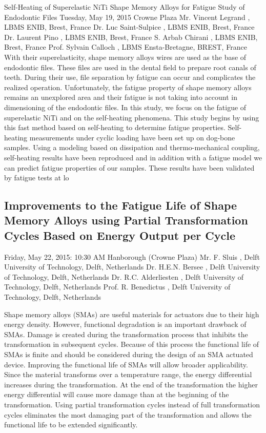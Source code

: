 \documentclass[12pt, a4paper]{article}
\begin{document}
Self-Heating of Superelastic NiTi Shape Memory Alloys for Fatigue Study of Endodontic Files
Tuesday, May 19, 2015
Crowne Plaza
Mr. Vincent Legrand , LBMS ENIB, Brest, France
Dr. Luc Saint-Sulpice , LBMS ENIB, Brest, France
Dr. Laurent Pino , LBMS ENIB, Brest, France
S. Arbab Chirani , LBMS ENIB, Brest, France
Prof. Sylvain Calloch , LBMS Ensta-Bretagne, BREST, France
With their superelasticity, shape memory alloys wires are used as the base of endodontic files. These files are used in the dental field to prepare root canals of teeth. During their use, file separation by fatigue can occur and complicates the realized operation. Unfortunately, the fatigue property of shape memory alloys remains an unexplored area and their fatigue is not taking into account in dimensioning of the endodontic files. In this study, we focus on the fatigue of superelastic NiTi and on the self-heating phenomena. This study begins by using this fast method based on self-heating to determine fatigue properties. Self-heating measurements under cyclic loading have been set up on dog-bone samples. Using a modeling based on dissipation and thermo-mechanical coupling, self-heating results have been reproduced and in addition with a fatigue model we can predict fatigue properties of our samples. These results have been validated by fatigue tests at lo




\subsection*{Improvements to the Fatigue Life of Shape Memory Alloys using Partial Transformation Cycles Based on Energy Output per Cycle}
Friday, May 22, 2015: 10:30 AM
Hanborough (Crowne Plaza)
Mr. F. Sluis , Delft University of Technology, Delft, Netherlands
Dr. H.E.N. Bersee , Delft University of Technology, Delft, Netherlands
Dr. R.C. Alderliesten , Delft University of Technology, Delft, Netherlands
Prof. R. Benedictus , Delft University of Technology, Delft, Netherlands


\noindent Shape memory alloys (SMAs) are useful materials for actuators due to their high energy density. However, functional degradation is an important drawback of SMAs. Damage is created during the transformation process that inhibits the transformation in subsequent cycles. Because of this process the functional life of SMAs is finite and should be considered during the design of an SMA actuated device. Improving the functional life of SMAs will allow broader applicability.
Since the material transforms over a temperature range, the energy differential increases during the transformation. At the end of the transformation the higher energy differential will cause more damage than at the beginning of the transformation. Using partial transformation cycles instead of full transformation cycles eliminates the most damaging part of the transformation and allows the functional life to be extended significantly.
\end{document}
